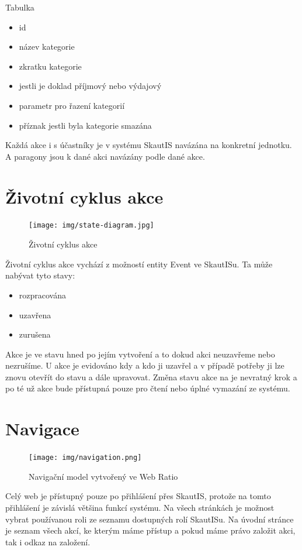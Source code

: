 \documentclass[thesis=B,czech]{FITthesis}[2011/06/14]
\begin{document}
Tabulka  
 \begin{itemize}
 	\item id
 	\item název kategorie
 	\item zkratku kategorie
 	\item jestli je doklad příjmový nebo výdajový
 	\item parametr pro řazení kategorií
 	\item příznak jestli byla kategorie smazána 
\end{itemize}
Každá akce i s účastníky je v systému SkautIS navázána na konkretní jednotku. A paragony jsou k dané akci navázány podle  dané akce. 

\section{Životní cyklus akce}
 \begin{figure}[h] \centering
 	\texttt{[image: img/state-diagram.jpg]}
 	\caption[Životní cyklus akce]{Životní cyklus akce}\label{fig:state-diagram}
 \end{figure}
 Životní cyklus akce vychází z možností entity Event ve SkautISu. Ta může nabývat tyto stavy:
 
 \begin{itemize}
 	\item rozpracována
	\item uzavřena
	\item zurušena
 \end{itemize} 
 
Akce je ve stavu  hned po jejím vytvoření a to dokud akci neuzavřeme nebo nezrušíme. U  akce je evidováno kdy a kdo ji uzavřel a v případě potřeby ji lze znovu otevřít do stavu  a dále upravovat. Změna stavu akce na  je nevratný krok a po té už akce bude přístupná pouze pro čtení nebo úplné vymazání ze systému.

\section{Navigace}
 \begin{figure}[h] \centering
 	\texttt{[image: img/navigation.png]}
 	\caption[Navigační model]{Navigační model vytvořený ve Web Ratio}\label{fig:navigation-diagram}
 \end{figure}

Celý web je přístupný pouze po přihlášení přes SkautIS, protože na tomto přihlášení je závislá většina funkcí systému. Na všech stránkách je možnost vybrat používanou roli ze seznamu dostupných rolí SkautISu. Na úvodní stránce je seznam všech akcí, ke kterým máme přístup a pokud máme právo založit akci, tak i odkaz na založení.
\end{document}
